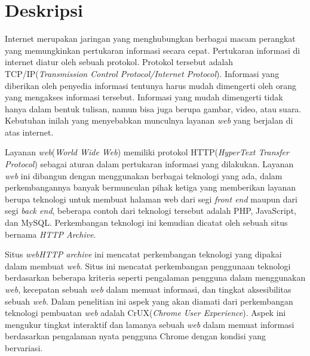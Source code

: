 \documentclass[a4paper,twoside]{article}
\newcommand{\web}{\textit{web}\xspace}
\begin{document}
	
	\title{\@judultopik}
	\author{\nama \textendash \@npm} 
	
	\newcommand{\nama}{Alfonsus Oktario Sutomo}
	\newcommand{\@npm}{6181801010}
	\newcommand{\@judultopik}{Perkembangan Penggunaan Teknologi Pembangunan Web Dunia} %
	\newcommand{\jumpemb}{1} %
	\newcommand{\tanggal}{19/02/2025}
	
	
	\maketitle
	
	
	\section{Deskripsi}
	Internet merupakan jaringan yang menghubungkan berbagai macam perangkat yang memungkinkan pertukaran informasi secara cepat. Pertukaran informasi di internet diatur oleh sebuah protokol. Protokol tersebut adalah TCP/IP(\textit{Transmission Control Protocol/Internet Protocol}). Informasi yang diberikan oleh penyedia informasi tentunya harus mudah dimengerti oleh orang yang mengakses informasi tersebut. Informasi yang mudah dimengerti tidak hanya dalam bentuk tulisan, namun bisa juga berupa gambar, video, atau suara. Kebutuhan inilah yang menyebabkan munculnya layanan \web yang berjalan di atas internet.

    Layanan \web(\textit{World Wide Web}) memiliki protokol HTTP(\textit{HyperText Transfer Protocol}) sebagai aturan dalam pertukaran informasi yang dilakukan. Layanan \web ini dibangun dengan menggunakan berbagai teknologi yang ada, dalam perkembangannya banyak bermunculan pihak ketiga yang memberikan layanan berupa teknologi untuk membuat halaman web dari segi \textit{front end} maupun dari segi \textit{back end}, beberapa contoh dari teknologi tersebut adalah PHP, JavaScript, dan MySQL. Perkembangan teknologi ini kemudian dicatat oleh sebuah situs bernama \textit{HTTP Archive}.

    Situs \web \textit{HTTP archive} ini mencatat perkembangan teknologi yang dipakai dalam membuat \web. Situs ini mencatat perkembangan penggunaan teknologi berdasarkan beberapa kriteria seperti pengalaman pengguna dalam menggunakan \web, kecepatan sebuah \web dalam memuat informasi, dan tingkat aksesibilitas sebuah \web. Dalam penelitian ini aspek yang akan diamati dari perkembangan teknologi pembuatan \web adalah CrUX(\textit{Chrome User Experience}). Aspek ini mengukur tingkat interaktif dan lamanya sebuah \web dalam memuat informasi berdasarkan pengalaman nyata pengguna Chrome dengan kondisi yang bervariasi. 
\end{document}
